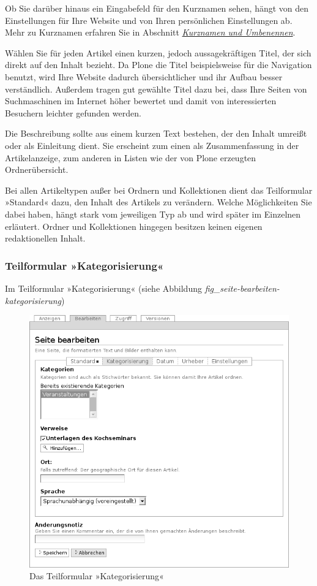 \documentclass[a4paper,12pt,ngerman]{manual}
\begin{document}
Ob Sie darüber hinaus ein Eingabefeld für den Kurznamen sehen, hängt von den
Einstellungen für Ihre Website und von Ihren persönlichen Einstellungen ab. Mehr
zu Kurznamen erfahren Sie in Abschnitt \hyperlink{sec-kurzname}{\emph{Kurznamen und Umbenennen}}.

Wählen Sie für jeden Artikel einen kurzen, jedoch aussagekräftigen Titel, der
sich direkt auf den Inhalt bezieht. Da Plone die
Titel beispielsweise für die Navigation benutzt, wird Ihre Website
dadurch übersichtlicher und ihr Aufbau besser verständlich. Außerdem tragen
gut gewählte Titel dazu bei, dass Ihre Seiten von Suchmaschinen im Internet
höher bewertet und damit von interessierten Besuchern leichter gefunden
werden.

Die Beschreibung sollte aus einem kurzen Text bestehen, der den Inhalt
umreißt oder als Einleitung dient. Sie erscheint zum einen als
Zusammenfassung in der Artikelanzeige, zum anderen in Listen wie der von Plone
erzeugten Ordnerübersicht.

Bei allen Artikeltypen außer bei Ordnern und Kollektionen dient das Teilformular
»Standard« dazu, den Inhalt des Artikels zu verändern. Welche Möglichkeiten
Sie dabei haben, hängt stark vom jeweiligen Typ ab und wird später im
Einzelnen erläutert. Ordner und Kollektionen hingegen besitzen keinen eigenen
redaktionellen Inhalt.
\hypertarget{sec-teilf-kateg}{}

\subsubsection{Teilformular »Kategorisierung«}

Im Teilformular »Kategorisierung« (siehe
Abbildung \emph{fig\_seite-bearbeiten-kategorisierung})
\begin{figure}[htbp]
\centering

\includegraphics{seite-bearbeiten-kategorisierung.png}
\caption{Das Teilformular »Kategorisierung«}\end{figure}
\end{document}
